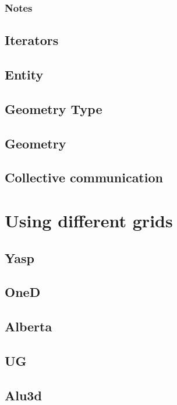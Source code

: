 \documentclass[11pt,a4paper,headinclude,footinclude,DIV14,BCOR8.25mm,titlepage,twoside,openright,normalheadings]{scrreprt}
\begin{document}
\subsection{Notes}


\section{Iterators}

\section{Entity}

\section{Geometry Type}

\section{Geometry}

\section{Collective communication}


\chapter{Using different grids}

\section{Yasp}

\section{OneD}

\section{Alberta}

\section{UG}

\section{Alu3d}
\end{document}
